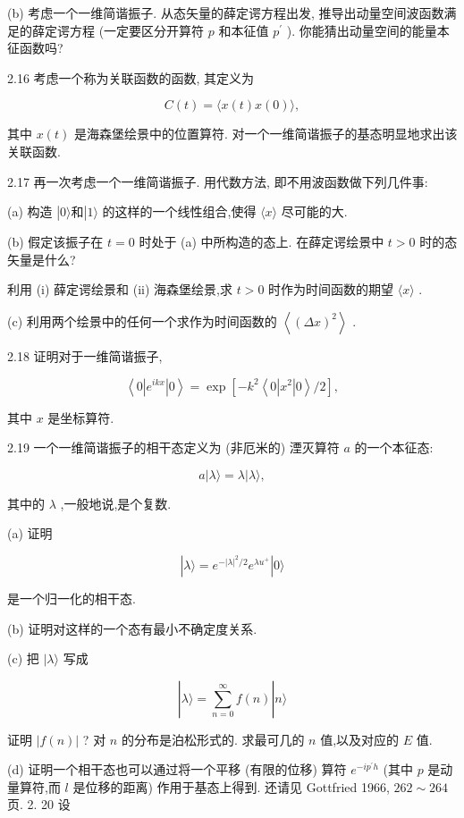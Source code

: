 \documentclass[lang=cn,newtx,10pt,scheme=chinese,thmcnt=section]{elegantbook}
\begin{document}
(b) 考虑一个一维简谐振子. 从态矢量的薛定谔方程出发, 推导出动量空间波函数满足的薛定谔方程 (一定要区分开算符 $p$ 和本征值 ${p}^{\prime }$ ). 你能猜出动量空间的能量本征函数吗?

2.16 考虑一个称为关联函数的函数, 其定义为

$$
C\left( t\right) = \langle x\left( t\right) x\left( 0\right) \rangle ,
$$

其中 $x\left( t\right)$ 是海森堡绘景中的位置算符. 对一个一维简谐振子的基态明显地求出该关联函数.

2.17 再一次考虑一个一维简谐振子. 用代数方法, 即不用波函数做下列几件事:

(a) 构造 $\left| {0\rangle \text{和}}\right| 1\rangle$ 的这样的一个线性组合,使得 $\langle x\rangle$ 尽可能的大.

(b) 假定该振子在 $t = 0$ 时处于 (a) 中所构造的态上. 在薛定谔绘景中 $t > 0$ 时的态矢量是什么?

利用 (i) 薛定谔绘景和 (ii) 海森堡绘景,求 $t > 0$ 时作为时间函数的期望 $\langle x\rangle$ .

(c) 利用两个绘景中的任何一个求作为时间函数的 $\left\langle {\left( \Delta x\right) }^{2}\right\rangle$ .

2.18 证明对于一维简谐振子,

$$
\left\langle {0\left| {e}^{ikx}\right| 0}\right\rangle = \exp \left\lbrack {-{k}^{2}\left\langle {0\left| {x}^{2}\right| 0}\right\rangle /2}\right\rbrack ,
$$

其中 $x$ 是坐标算符.

2.19 一个一维简谐振子的相干态定义为 (非厄米的) 湮灭算符 $a$ 的一个本征态:

$$
a\left| {\lambda \rangle = \lambda }\right| \lambda \rangle ,
$$

其中的 $\lambda$ ,一般地说,是个复数.

(a) 证明

$$
\left| {\lambda \rangle = {e}^{-{\left| \lambda \right| }^{2}/2}{e}^{\lambda {u}^{ + }}}\right| 0\rangle
$$

是一个归一化的相干态.

(b) 证明对这样的一个态有最小不确定度关系.

(c) 把 $|\lambda \rangle$ 写成

$$
\left| {\lambda \rangle = \mathop{\sum }\limits_{{n = 0}}^{\infty }f\left( n\right) }\right| n\rangle
$$

证明 $\left| {f\left( n\right) }\right|$ ? 对 $n$ 的分布是泊松形式的. 求最可几的 $n$ 值,以及对应的 $E$ 值.

(d) 证明一个相干态也可以通过将一个平移 (有限的位移) 算符 ${e}^{-i{p}^{\prime }h}$ (其中 $p$ 是动量算符,而 $l$ 是位移的距离) 作用于基态上得到. 还请见 Gottfried 1966, ${262} \sim {264}$ 页. 2. 20 设
\end{document}
